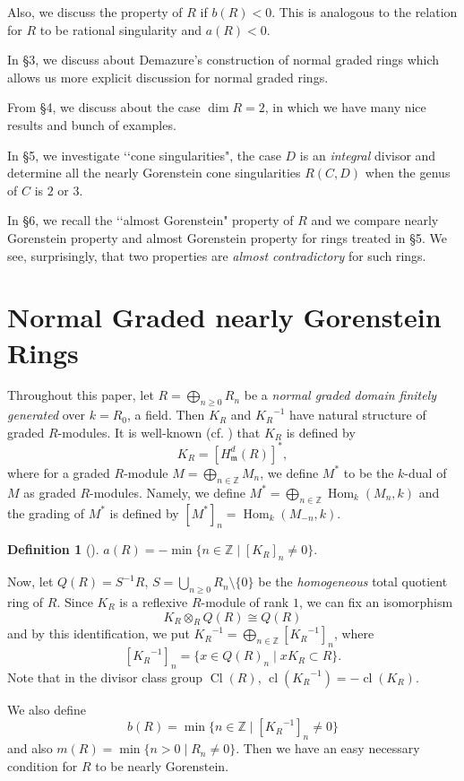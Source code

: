 \documentclass[12pt]{amsart}
\theoremstyle{definition}
\newtheorem{defn}[thm]{Definition}
\theoremstyle{remark}
\numberwithin{equation}{section}
\DeclareMathOperator{\Hom}{Hom}
\DeclareMathOperator{\Cl}{Cl}
\DeclareMathOperator{\cl}{cl}
\newcommand{\m}{\mathfrak m}
\newcommand{\KiR}{{K_R}^{-1}}
\newcommand{\Z}{\mathbb Z}
\newcommand{\bbZ}{\ensuremath{\mathbb Z}}
\renewcommand{\:}{\colon}
\begin{document}
\par 
Also, we discuss the property of $R$ if $b(R)<0$. This is analogous to the relation for $R$ 
to be rational singularity and $a(R)<0$. 

\par 
In \S 3, we discuss about Demazure's construction of normal graded rings 
which allows us more explicit discussion for normal graded rings. 

\par 
From \S 4, we discuss about the case $\dim R=2$, in which we have many nice results and 
bunch of examples. 
\par 
In \S 5, we investigate \lq\lq cone singularities", the case $D$ is an {\em integral} divisor
and determine all the nearly Gorenstein cone singularities $R(C,D)$ when the genus of $C$ is   
$2$ or $3$. 

\par
In \S 6, we recall the \lq\lq almost Gorenstein" property of $R$ 
and we compare nearly Gorenstein property and almost Gorenstein property 
for rings treated in \S 5.  
We see, surprisingly,  that two properties are {\em almost contradictory} for such rings. 



\bigskip
\section{Normal Graded nearly Gorenstein Rings}
\label{s:Graded}



Throughout this paper, let $R = \bigoplus_{n\ge 0} R_n$ be a 
{\em normal  graded domain finitely generated} over $k= R_0$, a field. 
Then $K_R$ and $\KiR$ have natural structure of graded $R$-modules. 
It is well-known (cf. \cite{GW}) that $K_R$ is defined by 
\[
K_R= [H^d_{\m}(R)]^*, 
\]
where for a graded $R$-module $M =\bigoplus_{n\in \Z} M_n$, we define 
$M^*$ to be the $k$-dual of $M$ as graded $R$-modules. 
Namely, we define $M^{*}=\bigoplus_{n\in \Z} \Hom_k(M_n, k)$ 
 and the grading of $M^*$ is defined by $[M^*]_n = \Hom_k(M_{-n}, k)$.


\begin{defn}[\textrm{\cite{GW}}]
$a(R) = -  \min\{n\in \bbZ\;|\; [K_R]_n \ne 0\}$.  
\end{defn}
\par 
Now, let $Q(R) = S^{-1}R$, $S = \bigcup_{n\ge 0} R_n\setminus \{0\}$  
be the {\em homogeneous} total quotient ring of $R$. 
Since $K_R$ is a reflexive $R$-module of rank $1$, 
we can fix an isomorphism 
\[ 
K_R \otimes_R Q(R) \cong Q(R)
\] 
and by this identification, we put 
$\KiR = \bigoplus_{n\in \Z} [\KiR]_n$,  where
\[
[\KiR]_n = \{ x\in Q(R)_n \;|\; x K_R \subset R\}.
\]  
Note that in the divisor class group $\Cl(R)$, $\cl(\KiR) = - \cl(K_R)$. 
\par 
We also define 
\[
b(R) =  \min\{n\in \bbZ\;|\; [\KiR]_n \ne 0\} 
\]
and also $m(R) = \min\{n>0\;|\; R_n\ne 0\}$. 
Then we have an easy necessary condition for $R$ to be nearly Gorenstein. 
\end{document}
